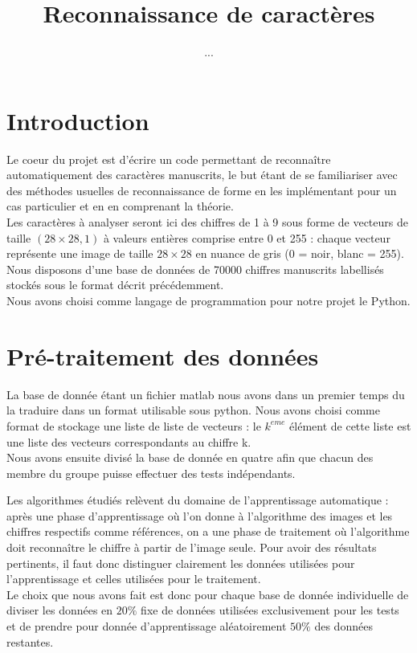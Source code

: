 \documentclass[a4paper,11pt,twoside]{report}
\author{...}
\title{Reconnaissance de caractères}
\begin{document}
 
\maketitle 


\chapter{Introduction}

Le coeur du projet est d'écrire un code permettant de reconnaître automatiquement des caractères manuscrits, le but étant de se familiariser avec des méthodes usuelles de reconnaissance de forme en les implémentant pour un cas particulier et en en comprenant la théorie. \\


Les caractères à analyser seront ici des chiffres de 1 à 9 sous forme de vecteurs de taille $(28\times28,1)$ à valeurs entières comprise entre 0 et 255 : chaque vecteur représente une image de taille $28\times28$ en nuance de gris (0 = noir, blanc = 255). Nous disposons d'une base de données de 70000 chiffres manuscrits labellisés stockés sous le format décrit précédemment.\\
 
Nous avons choisi comme langage de programmation pour notre projet le Python.

\chapter{Pré-traitement des données}
La base de donnée étant un fichier matlab nous avons dans un premier temps du la traduire dans un format utilisable sous python. Nous avons choisi comme format de stockage une liste de liste de vecteurs : le $k^{eme}$ élément de cette liste est une liste des vecteurs correspondants au chiffre k.\\
Nous avons ensuite divisé la base de donnée en quatre afin que chacun des membre du groupe puisse effectuer des tests indépendants. 

Les algorithmes étudiés relèvent du domaine de l'apprentissage automatique : après une phase d'apprentissage où l'on donne à l'algorithme des images et les chiffres respectifs comme références, on a une phase de traitement où l'algorithme doit reconnaître le chiffre à partir de l'image seule. Pour avoir des résultats pertinents, il faut donc distinguer clairement les données utilisées pour l'apprentissage et celles utilisées pour le traitement.\\Le choix que nous avons fait est donc pour chaque base de donnée individuelle de diviser les données en $20\%$ fixe de données utilisées exclusivement pour les tests et de prendre pour donnée d'apprentissage aléatoirement $50\%$ des données restantes.
\end{document}

